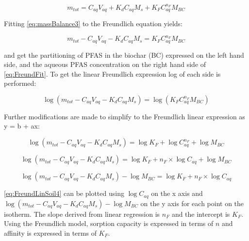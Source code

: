 \begin{equation} \label{eq:massBalance3}
     m_{tot} = C_{aq}V_{aq} + K_dC_{aq}M_s + K_{F}C_{aq}^{n_F}M_{BC}
\end{equation}
 
Fitting \cref{eq:massBalance3} to the Freundlich equation yields:

\begin{equation} \label{eq:FreundFit}
    m_{tot} - C_{aq}V_{aq} - K_dC_{aq}M_s = K_{F}C_{aq}^{n_F}M_{BC}
\end{equation}

and get the partitioning of PFAS in the biochar (BC) expressed on the left hand side, and the aqueous PFAS concentration on the right hand side of \cref{eq:FreundFit}. To get the linear Freundlich expression log of each side is performed:

\begin{equation} \label{eq:FreundLinSoil1}
   \log (m_{tot} - C_{aq}V_{aq} - K_dC_{aq}M_s) = \log (K_{F}C_{aq}^{n_F}M_{BC})
\end{equation}

Further modifications are made to simplify to the Freundlich linear expression as y = b + ax:

\begin{equation} \label{eq:FreundLinSoil2}
    \log (m_{tot} - C_{aq}V_{aq} - K_dC_{aq}M_s) = \log K_{F} + \log C_{aq}^{n_F} + \log M_{BC}
\end{equation}

\begin{equation} \label{eq:FreundLinSoil3}
    \log (m_{tot} - C_{aq}V_{aq} - K_dC_{aq}M_s) = \log K_{F} + n_F \times \log C_{aq} + \log M_{BC}
\end{equation}

\begin{equation} \label{eq:FreundLinSoil4}
    \log (m_{tot} - C_{aq}V_{aq} - K_dC_{aq}M_s) - \log M_{BC} = \log K_{F} + n_F \times \log C_{aq}  
\end{equation}

\cref{eq:FreundLinSoil4} can be plotted using $\log C_{aq}$ on the x axis and $\log (m_{tot} - C_{aq}V_{aq} - K_dC_{aq}M_s) - \log M_{BC}$ on the y axis for each point on the isotherm. The slope derived from linear regression is $n_F$ and the intercept is $K_F$. Using the Freundlich model, sorption capacity is expressed in terms of \(n\) and affinity is expressed in terms of \(K_F\). 

